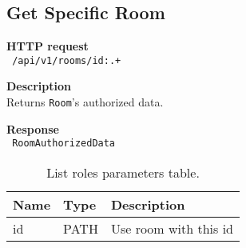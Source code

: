 \subsection{Get Specific Room}
\begin{description}
    \item \textbf{HTTP request}\\
        \texttt{\text{[GET]} /api/v1/rooms/{id:.+}}
    \item \textbf{Description}\\
        Returns \texttt{Room}'s authorized data.
    \item \textbf{Response}\\
        \texttt{\text{[200 OK]} RoomAuthorizedData}
\end{description}
\begin{table}[ht!]
    \begin{tabularx}{\textwidth}{llX}
        \toprule
        Name & Type & Description \\
        \midrule
        id & PATH & Use room with this id \\
        \bottomrule
        \end{tabularx}
    \caption{List roles parameters table.}
\end{table}
